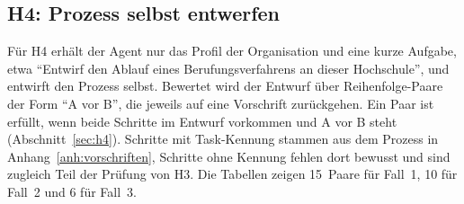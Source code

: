 \subsection{H4: Prozess selbst entwerfen}
Für H4 erhält der Agent nur das Profil der Organisation und eine kurze Aufgabe, etwa \enquote{Entwirf den Ablauf eines Berufungsverfahrens an dieser Hochschule}, und entwirft den Prozess selbst.
Bewertet wird der Entwurf über Reihenfolge-Paare der Form \enquote{A vor B}, die jeweils auf eine Vorschrift zurückgehen.
Ein Paar ist erfüllt, wenn beide Schritte im Entwurf vorkommen und A vor B steht (Abschnitt~\ref{sec:h4}).
Schritte mit Task-Kennung stammen aus dem Prozess in Anhang~\ref{anh:vorschriften}, Schritte ohne Kennung fehlen dort bewusst und sind zugleich Teil der Prüfung von H3.
Die Tabellen zeigen 15~Paare für Fall~1, 10 für Fall~2 und 6 für Fall~3.
